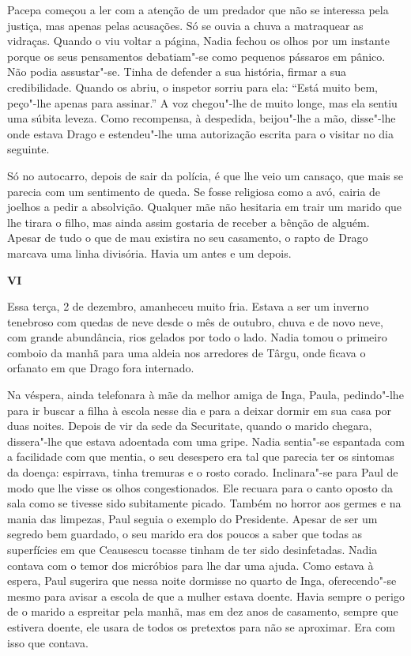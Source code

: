 Pacepa começou a ler com a atenção de um predador que não se interessa
pela justiça, mas apenas pelas acusações. Só se ouvia a chuva a
matraquear as vidraças. Quando o viu voltar a página, Nadia fechou os
olhos por um instante porque os seus pensamentos debatiam"-se como
pequenos pássaros em pânico. Não podia assustar"-se. Tinha de defender a sua história, firmar a sua credibilidade.
Quando os abriu, o inspetor sorriu para ela:
``Está muito bem, peço"-lhe apenas para assinar.'' A voz chegou"-lhe de
muito longe, mas ela sentiu uma súbita leveza. Como recompensa, à
despedida, beijou"-lhe a mão, disse"-lhe onde estava Drago e estendeu"-lhe
uma autorização escrita para o visitar no dia seguinte.

Só no autocarro, depois de sair da polícia, é que lhe veio um cansaço,
que mais se parecia com um sentimento de queda. Se fosse religiosa como
a avó, cairia de joelhos
a pedir a absolvição. Qualquer mãe não hesitaria em trair um marido que
lhe tirara o filho, mas ainda assim gostaria de receber a bênção de
alguém. Apesar de tudo o que de mau existira no seu casamento, o rapto
de Drago marcava uma linha divisória. Havia um antes e um depois.

\pagebreak
\thispagestyle{empty}
\movetooddpage
\vspace*{1.8cm}
\noindent{}\textbf{VI}

\bigskip

\noindent{}Essa terça, 2 de dezembro, amanheceu muito fria. Estava a ser um inverno
tenebroso com quedas de neve desde o mês de outubro, chuva e de novo
neve, com grande abundância, rios gelados por todo o lado. Nadia tomou o
primeiro comboio da manhã para uma aldeia nos arredores de Târgu, onde
ficava o orfanato em que Drago fora internado.

Na véspera, ainda telefonara à mãe da melhor amiga de Inga, Paula,
pedindo"-lhe para ir buscar a filha à escola nesse dia e para a deixar
dormir em sua casa por duas noites. Depois de vir da sede da Securitate,
quando o marido chegara, dissera"-lhe que estava adoentada com uma gripe.
Nadia sentia"-se espantada com a facilidade com que mentia, o seu
desespero era tal que parecia ter os sintomas da doença: espirrava,
tinha tremuras e o rosto corado. Inclinara"-se para Paul de modo que lhe
visse os olhos congestionados. Ele recuara para o canto oposto da sala
como se tivesse sido subitamente picado. Também no horror aos germes e
na mania das limpezas, Paul seguia o exemplo do Presidente. Apesar de
ser um segredo bem
guardado, o seu marido era dos poucos a saber que todas as superfícies
em que Ceausescu tocasse tinham de ter sido desinfetadas. Nadia contava
com o temor dos micróbios para lhe dar uma ajuda. Como estava à espera,
Paul sugerira que nessa noite dormisse no quarto de Inga, oferecendo"-se mesmo para avisar a escola de que a mulher estava doente. Havia
sempre o perigo de o marido a espreitar pela manhã, mas em dez anos de
casamento, sempre que estivera doente, ele usara de todos os pretextos
para não se aproximar. Era com isso que contava.

